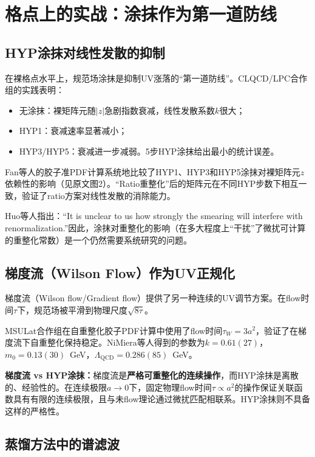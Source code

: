 \documentclass[12pt,a4paper]{ctexart}
\theoremstyle{definition}
\begin{document}
\section{格点上的实战：涂抹作为第一道防线}

\subsection{HYP涂抹对线性发散的抑制}

在裸格点水平上，规范场涂抹是抑制UV涨落的``第一道防线''。CLQCD/LPC合作组的实践表明\cite{Chen2025gluon,Fan2018gluon}：

\begin{itemize}
    \item 无涂抹：裸矩阵元随$|z|$急剧指数衰减，线性发散系数$k$很大；
    \item HYP1：衰减速率显著减小；
    \item HYP3/HYP5：衰减进一步减弱。5步HYP涂抹给出最小的统计误差。
\end{itemize}

Fan等人\cite{Fan2018gluon}的胶子准PDF计算系统地比较了HYP1、HYP3和HYP5涂抹对裸矩阵元$z$依赖性的影响（见原文图2）。``Ratio重整化''后的矩阵元在不同HYP步数下相互一致，验证了ratio方案对线性发散的消除能力。

Huo等人\cite{Huo2021self}指出：``It is unclear to us how strongly the smearing will interfere with renormalization.''因此，涂抹对重整化的影响（在多大程度上``干扰''了微扰可计算的重整化常数）是一个仍然需要系统研究的问题。

\subsection{梯度流（Wilson Flow）作为UV正规化}

梯度流（Wilson flow/Gradient flow）提供了另一种连续的UV调节方案\cite{NieMiera2025,Chen2025gluon}。在flow时间$\tau$下，规范场被平滑到物理尺度$\sqrt{8\tau}$。

MSULat合作组\cite{NieMiera2025}在自重整化胶子PDF计算中使用了flow时间$\tau_W = 3a^2$，验证了在梯度流下自重整化保持稳定。NiMiera等人得到的参数为$k = 0.61(27)$，$m_0 = 0.13(30)$~GeV，$\Lambda_{\text{QCD}} = 0.286(85)$~GeV。

\textbf{梯度流 vs HYP涂抹：}梯度流是\textbf{严格可重整化的连续操作}，而HYP涂抹是离散的、经验性的。在连续极限$a \to 0$下，固定物理flow时间$\tau \propto a^2$的操作保证关联函数具有有限的连续极限，且与未flow理论通过微扰匹配相联系。HYP涂抹则不具备这样的严格性。

\subsection{蒸馏方法中的谱滤波}
\end{document}
